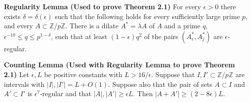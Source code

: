 \documentclass[12pt]{article}
\theoremstyle{definition}
\newcommand{\integers}{\mathbb{Z}}
\begin{document}
\vfill

\noindent\textbf{Regularity Lemma (Used to prove Theorem 2.1)}
For every $\epsilon>0$ there exists $\delta = \delta(\epsilon)$ such that the following holds for every sufficiently large prime $p$, and every $A\subset \integers/p\integers$. There is a dilate $A^* = \lambda A$ of $A$ and a prime $q$, $\epsilon^{-10}\leq q\leq p^{1-\delta}$, such that at least $(1-\epsilon)q^2$ of the pairs $(A^*_i, A^*_j)$ are $\epsilon$-regular.

\vfill


\noindent\textbf{Counting Lemma (Used with Regularity Lemma to prove Theorem 2.1)}
Let $\epsilon, L$ be positive constants with $L > 16/\epsilon$. Suppose that $I,I'\subset \integers/p\integers$ are intervals with $|I|,|I'| = L+O(1)$. Suppose also that the pair of sets $A\subset I$ and $A'\subset I'$ is $\epsilon^7$-regular and that $|A|,|A'|\geq \epsilon L$. Then $|A+A'|\geq (2-8\epsilon)L$.

\vfill
\end{document}
